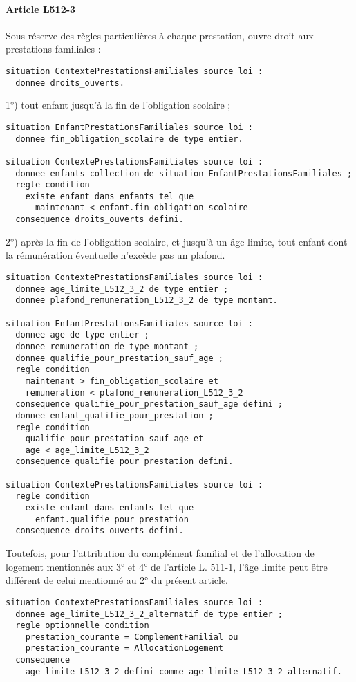 \documentclass[11pt, french]{article}
\begin{document}
\paragraph{Article L512-3} Sous réserve des règles particulières à chaque prestation, ouvre droit aux prestations familiales :
\begin{lstlisting}
situation ContextePrestationsFamiliales source loi :
  donnee droits_ouverts.
\end{lstlisting}
1°) tout enfant jusqu'à la fin de l'obligation scolaire ;
\begin{lstlisting}
situation EnfantPrestationsFamiliales source loi :
  donnee fin_obligation_scolaire de type entier.

situation ContextePrestationsFamiliales source loi :
  donnee enfants collection de situation EnfantPrestationsFamiliales ;
  regle condition
    existe enfant dans enfants tel que
      maintenant < enfant.fin_obligation_scolaire
  consequence droits_ouverts defini.
\end{lstlisting}
2°) après la fin de l'obligation scolaire, et jusqu'à un âge limite, tout enfant dont la rémunération éventuelle n'excède pas un plafond.
\begin{lstlisting}
situation ContextePrestationsFamiliales source loi :
  donnee age_limite_L512_3_2 de type entier ;
  donnee plafond_remuneration_L512_3_2 de type montant.

situation EnfantPrestationsFamiliales source loi :
  donnee age de type entier ;
  donnee remuneration de type montant ;
  donnee qualifie_pour_prestation_sauf_age ;
  regle condition
    maintenant > fin_obligation_scolaire et
    remuneration < plafond_remuneration_L512_3_2
  consequence qualifie_pour_prestation_sauf_age defini ;
  donnee enfant_qualifie_pour_prestation ;
  regle condition
    qualifie_pour_prestation_sauf_age et
    age < age_limite_L512_3_2
  consequence qualifie_pour_prestation defini.

situation ContextePrestationsFamiliales source loi :
  regle condition
    existe enfant dans enfants tel que
      enfant.qualifie_pour_prestation
  consequence droits_ouverts defini.
\end{lstlisting}
Toutefois, pour l'attribution du complément familial et de l'allocation de logement mentionnés aux 3° et 4° de l'article L. 511-1, l'âge limite peut être différent de celui mentionné au 2° du présent article.
\begin{lstlisting}
situation ContextePrestationsFamiliales source loi :
  donnee age_limite_L512_3_2_alternatif de type entier ;
  regle optionnelle condition
    prestation_courante = ComplementFamilial ou
    prestation_courante = AllocationLogement
  consequence
    age_limite_L512_3_2 defini comme age_limite_L512_3_2_alternatif.
\end{lstlisting}
\end{document}
